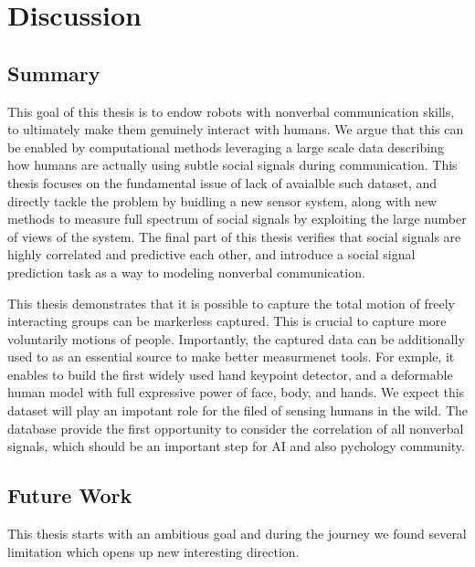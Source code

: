 
\chapter{Discussion}
\label{chapter:discussion}

\section{Summary}

This goal of this thesis is to endow robots with nonverbal communication skills, to ultimately make them genuinely interact with humans. We argue that this can be enabled by computational methods leveraging a large scale data describing how humans are actually using subtle social signals during communication.  This thesis focuses on the fundamental issue of lack of avaialble such dataset, and directly tackle the problem by buidling a new sensor system, along with new methods to measure full spectrum of social signals by exploiting the large number of views of the system.  The final part of this thesis verifies that social signals are highly correlated and predictive each other, and introduce a social signal prediction task as a way to modeling nonverbal communication.

This thesis demonstrates that it is possible to capture the total motion of freely interacting groups can be markerless captured. This is crucial to capture more voluntarily motions of people. Importantly, the captured data can be additionally used to as an essential source to make better measurmenet tools. For exmple, it enables to build the first widely used hand keypoint detector, and a deformable human model with full expressive power of face, body, and hands. We expect this dataset will play an impotant role for the filed of sensing humans in the wild. The database provide the first opportunity to consider the correlation of all nonverbal signals, which should be an important step for AI and also pychology community.

\section{Future Work}
This thesis starts with an ambitious goal and during the journey we found several limitation which opens up new interesting direction.


